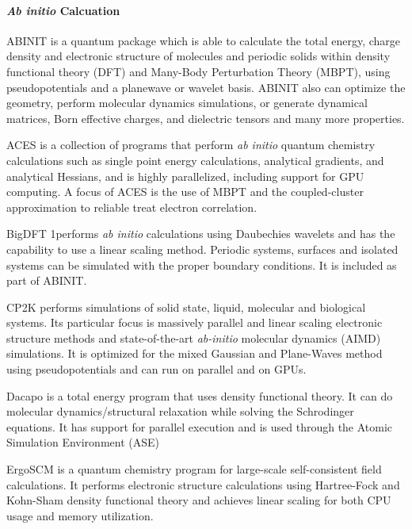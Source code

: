 \paragraph{\textit{Ab initio} Calcuation}

ABINIT \cite{Gonze_2009} is a quantum package which is able to calculate the total energy, charge density and electronic structure of molecules and periodic solids within density functional theory (DFT) and Many-Body Perturbation Theory (MBPT), using pseudopotentials and a planewave or wavelet basis. ABINIT also can optimize the geometry, perform molecular dynamics simulations, or generate dynamical matrices, Born effective charges, and dielectric tensors and many more properties. 

ACES \cite{Lotrich_2008} is a collection of programs that perform \textit{ab initio} quantum chemistry calculations such as single point energy calculations, analytical gradients, and analytical Hessians, and is highly parallelized, including support for GPU computing.
A focus of ACES is the use of MBPT and the coupled-cluster approximation to reliable treat electron correlation.

BigDFT \cite{Genovese_2008,Mohr_2014,Mohr_2015} 1performs \textit{ab initio} calculations using Daubechies wavelets and has the capability to use a linear scaling method.  Periodic systems, surfaces and isolated systems can be simulated with the proper boundary conditions. It is included as part of ABINIT.

CP2K \cite{Hutter_2013} performs simulations of solid state, liquid, molecular and biological systems. Its particular focus is massively parallel and linear scaling electronic structure methods and state-of-the-art \textit{ab-initio} molecular dynamics (AIMD) simulations. It is optimized for the mixed Gaussian and Plane-Waves method using pseudopotentials and can run on parallel and on GPUs.

Dacapo is a total energy program that uses density functional theory. It can do molecular dynamics/structural relaxation while solving the Schrodinger equations. It has support for parallel execution and is used through the Atomic Simulation Environment (ASE) \cite{Bahn_2002}

ErgoSCM \cite{Rudberg_2011} is a quantum chemistry program for large-scale self-consistent field calculations. It performs electronic structure calculations using Hartree-Fock and Kohn-Sham density functional theory and achieves linear scaling for both CPU usage and memory utilization.

